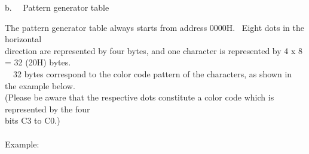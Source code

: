 \documentclass[a4paper,10pt]{article}
\begin{document}
\noindent b. \ \ Pattern generator table\par
The pattern generator table always starts from address 0000H. \ Eight dots in the horizontal\\
direction are represented by four bytes, and one character is represented by 4 x 8 = 32 (20H) bytes.\\
\phantom \ \ 32 bytes correspond to the color code pattern of the characters, as shown in the example below.\\
(Please be aware that the respective dots constitute a color code which is represented by the four\\
bits C3 to C0.)\\
\\
Example:

\vspace{-0.7em}
\setlength{\arrayrulewidth}{0.1em}
\setlength{\tabcolsep}{0.5em}
\renewcommand{\arraystretch}{2}
\end{document}
